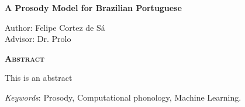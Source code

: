 \begin{center}
	{\Large{\textbf{A Prosody Model for Brazilian Portuguese}}}
\end{center}

\vspace{1cm}

\begin{flushright}
	Author: Felipe Cortez de Sá\\
	Advisor: Dr. Prolo
\end{flushright}

\vspace{1cm}

\begin{center}
	\Large{\textsc{\textbf{Abstract}}}
\end{center}

\noindent This is an abstract

\noindent\textit{Keywords}: Prosody, Computational phonology, Machine Learning.
